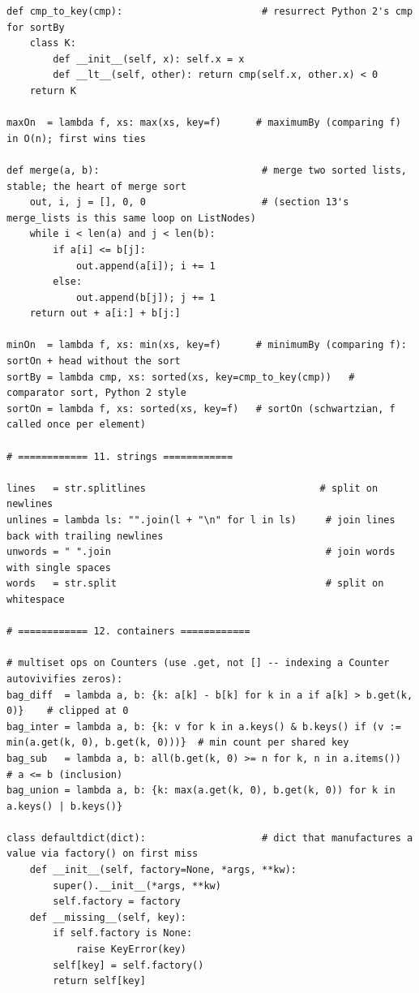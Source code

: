 \documentclass[11pt,letterpaper]{book}
\begin{document}
\begin{lstlisting}[style=file]
def cmp_to_key(cmp):                        # resurrect Python 2's cmp for sortBy
    class K:
        def __init__(self, x): self.x = x
        def __lt__(self, other): return cmp(self.x, other.x) < 0
    return K

maxOn  = lambda f, xs: max(xs, key=f)      # maximumBy (comparing f) in O(n); first wins ties

def merge(a, b):                            # merge two sorted lists, stable; the heart of merge sort
    out, i, j = [], 0, 0                    # (section 13's merge_lists is this same loop on ListNodes)
    while i < len(a) and j < len(b):
        if a[i] <= b[j]:
            out.append(a[i]); i += 1
        else:
            out.append(b[j]); j += 1
    return out + a[i:] + b[j:]

minOn  = lambda f, xs: min(xs, key=f)      # minimumBy (comparing f): sortOn + head without the sort
sortBy = lambda cmp, xs: sorted(xs, key=cmp_to_key(cmp))   # comparator sort, Python 2 style
sortOn = lambda f, xs: sorted(xs, key=f)   # sortOn (schwartzian, f called once per element)

# ============ 11. strings ============

lines   = str.splitlines                              # split on newlines
unlines = lambda ls: "".join(l + "\n" for l in ls)     # join lines back with trailing newlines
unwords = " ".join                                     # join words with single spaces
words   = str.split                                    # split on whitespace

# ============ 12. containers ============

# multiset ops on Counters (use .get, not [] -- indexing a Counter autovivifies zeros):
bag_diff  = lambda a, b: {k: a[k] - b[k] for k in a if a[k] > b.get(k, 0)}    # clipped at 0
bag_inter = lambda a, b: {k: v for k in a.keys() & b.keys() if (v := min(a.get(k, 0), b.get(k, 0)))}  # min count per shared key
bag_sub   = lambda a, b: all(b.get(k, 0) >= n for k, n in a.items())          # a <= b (inclusion)
bag_union = lambda a, b: {k: max(a.get(k, 0), b.get(k, 0)) for k in a.keys() | b.keys()}

class defaultdict(dict):                    # dict that manufactures a value via factory() on first miss
    def __init__(self, factory=None, *args, **kw):
        super().__init__(*args, **kw)
        self.factory = factory
    def __missing__(self, key):
        if self.factory is None:
            raise KeyError(key)
        self[key] = self.factory()
        return self[key]


\end{lstlisting}
\end{document}
